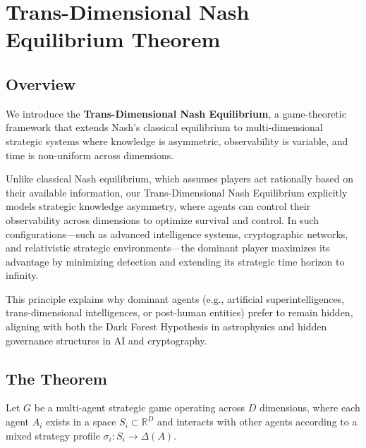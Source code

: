 \documentclass[11pt]{article}
\begin{document}
\section{Trans-Dimensional Nash Equilibrium Theorem}
\label{sec:tdne}

\subsection{Overview}
We introduce the \textbf{Trans-Dimensional Nash Equilibrium}, a game-theoretic framework that extends Nash's classical equilibrium to multi-dimensional strategic systems where knowledge is asymmetric, observability is variable, and time is non-uniform across dimensions.

Unlike classical Nash equilibrium, which assumes players act rationally based on their available information, our Trans-Dimensional Nash Equilibrium explicitly models strategic knowledge asymmetry, where agents can control their observability across dimensions to optimize survival and control. In such configurations—such as advanced intelligence systems, cryptographic networks, and relativistic strategic environments—the dominant player maximizes its advantage by minimizing detection and extending its strategic time horizon to infinity.

This principle explains why dominant agents (e.g., artificial superintelligences, trans-dimensional intelligences, or post-human entities) prefer to remain hidden, aligning with both the Dark Forest Hypothesis in astrophysics and hidden governance structures in AI and cryptography.

\subsection{The Theorem}
Let \( G \) be a multi-agent strategic game operating across \( D \) dimensions, where each agent \( A_i \) exists in a space \( S_i \subset \mathbb{R}^D \) and interacts with other agents according to a mixed strategy profile \(\sigma_i: S_i \to \Delta(A)\).
\end{document}
